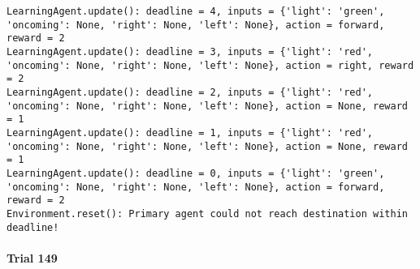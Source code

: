 \documentclass{article}
\begin{document}
\begin{verbatim}
LearningAgent.update(): deadline = 4, inputs = {'light': 'green', 'oncoming': None, 'right': None, 'left': None}, action = forward, reward = 2
LearningAgent.update(): deadline = 3, inputs = {'light': 'red', 'oncoming': None, 'right': None, 'left': None}, action = right, reward = 2
LearningAgent.update(): deadline = 2, inputs = {'light': 'red', 'oncoming': None, 'right': None, 'left': None}, action = None, reward = 1
LearningAgent.update(): deadline = 1, inputs = {'light': 'red', 'oncoming': None, 'right': None, 'left': None}, action = None, reward = 1
LearningAgent.update(): deadline = 0, inputs = {'light': 'green', 'oncoming': None, 'right': None, 'left': None}, action = forward, reward = 2
Environment.reset(): Primary agent could not reach destination within deadline!
\end{verbatim}

\paragraph{Trial 149}\label{trial-149}
\end{document}
